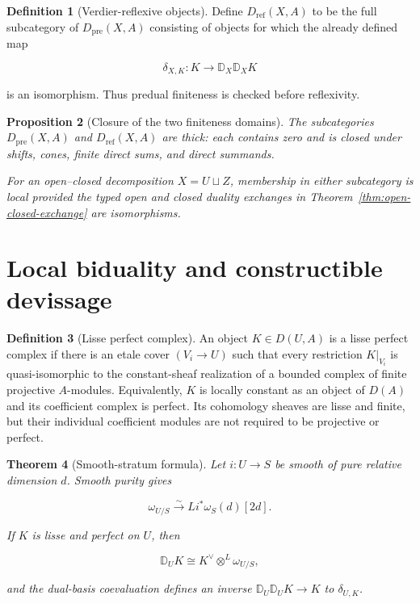 \documentclass[10pt]{article}
\newtheorem{theorem}{Theorem}[section]
\newtheorem{proposition}[theorem]{Proposition}
\theoremstyle{definition}
\newtheorem{definition}[theorem]{Definition}
\newcommand{\DD}{\mathbb D}
\begin{document}
\begin{definition}[Verdier-reflexive objects]
Define \(D_{\mathrm{ref}}(X,A)\) to be the full subcategory of
\(D_{\mathrm{pre}}(X,A)\) consisting of objects for which the already defined
map

\[
 \delta_{X,K}:K\longrightarrow\DD_X\DD_XK
\]

is an isomorphism.  Thus predual finiteness is checked before reflexivity.
\end{definition}

\begin{proposition}[Closure of the two finiteness domains]
The subcategories \(D_{\mathrm{pre}}(X,A)\) and
\(D_{\mathrm{ref}}(X,A)\) are thick: each contains zero and is closed under
shifts, cones, finite direct sums, and direct summands.

For an open--closed decomposition \(X=U\sqcup Z\), membership in either
subcategory is local provided the typed open and closed duality exchanges in
Theorem~\ref{thm:open-closed-exchange} are isomorphisms.
\end{proposition}

\section{Local biduality and constructible devissage}

\begin{definition}[Lisse perfect complex]
An object \(K\in D(U,A)\) is a lisse perfect complex if there is an etale
cover \((V_i\to U)\) such that every restriction \(K|_{V_i}\) is
quasi-isomorphic to the constant-sheaf realization of a bounded complex of
finite projective \(A\)-modules.  Equivalently, \(K\) is locally constant as
an object of \(D(A)\) and its coefficient complex is perfect.  Its
cohomology sheaves are lisse and finite, but their individual coefficient
modules are not required to be projective or perfect.
\end{definition}

\begin{theorem}[Smooth-stratum formula]
Let \(i:U\to S\) be smooth of pure relative dimension \(d\).  Smooth purity
gives

\[
 \omega_{U/S}\xrightarrow{\sim}Li^*\omega_S(d)[2d].
\]

If \(K\) is lisse and perfect on \(U\), then

\[
 \DD_UK\cong K^\vee\otimes^L\omega_{U/S},
\]

and the dual-basis coevaluation defines an inverse
\(\DD_U\DD_UK\to K\) to \(\delta_{U,K}\).
\end{theorem}
\end{document}
